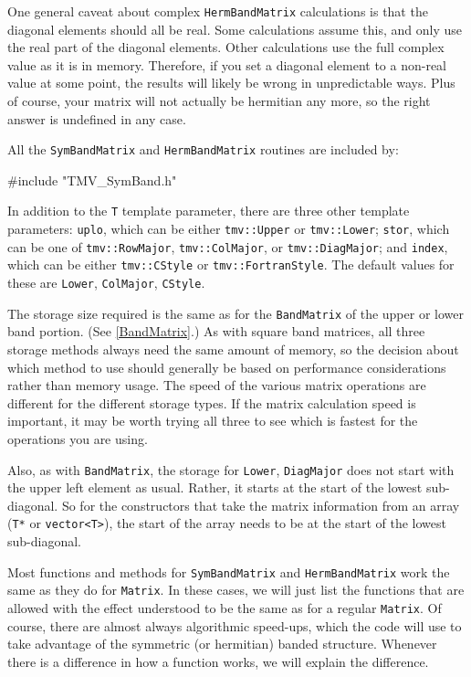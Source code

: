 \documentclass[twoside,letterpaper,11pt]{article}
\renewcommand{\tt}[1]{{\lstinline {#1}}}
\begin{document}
One general caveat about complex \tt{HermBandMatrix} calculations is that 
the diagonal elements should all be real.  Some calculations assume this, and 
only use the real part of the diagonal elements.  Other calculations use the 
full complex value as it is in memory.  Therefore, if you set a diagonal element
to a non-real value at some point, the results will likely be wrong in 
unpredictable ways.  Plus of course, your matrix will not actually be 
hermitian any more, so the right answer is undefined in any case.

All the \tt{SymBandMatrix} and \tt{HermBandMatrix} routines are included by:
\begin{tmvcode}
#include "TMV_SymBand.h"
\end{tmvcode}

In addition to the \tt{T} template parameter, there are three other template 
parameters: \tt{uplo}, which can be either \tt{tmv::Upper} or \tt{tmv::Lower};
\tt{stor}, which can be one of \tt{tmv::RowMajor}, \tt{tmv::ColMajor}, or 
\tt{tmv::DiagMajor}; and \tt{index}, which can be either \tt{tmv::CStyle}
or \tt{tmv::FortranStyle}.  The default values for these are 
\tt{Lower}, \tt{ColMajor}, \tt{CStyle}.

The storage size required is the same as for the \tt{BandMatrix} of
the upper or lower band portion.
(See \ref{BandMatrix}.)
As with square band matrices, 
all three storage methods always need the same amount of memory, so the 
decision about which method to use should generally be based on performance 
considerations rather than memory usage.
The speed of the various matrix operations are different for the different storage 
types.  If the matrix calculation speed is important, it may be worth trying 
all three to see which is fastest for the operations you are using.

Also, as with \tt{BandMatrix}, the storage for \tt{Lower}, \tt{DiagMajor} 
does not start with the upper left element as usual.
Rather, it starts at the start of the lowest sub-diagonal.  
So for the constructors that 
take the matrix information from an array (\tt{T*} or \tt{vector<T>}), 
the start of the array needs to be at the start of the lowest sub-diagonal.  

Most functions and methods for \tt{SymBandMatrix} and \tt{HermBandMatrix}
work the same as they do for \tt{Matrix}.
In these cases, we will just list the functions that are allowed with the
effect understood to be the same as for a regular \tt{Matrix}.  Of course, there are 
almost always algorithmic speed-ups, which the code will use to take advantage of the 
symmetric (or hermitian) banded structure.
Whenever there is a difference in how a function works,
we will explain the difference.
\end{document}
